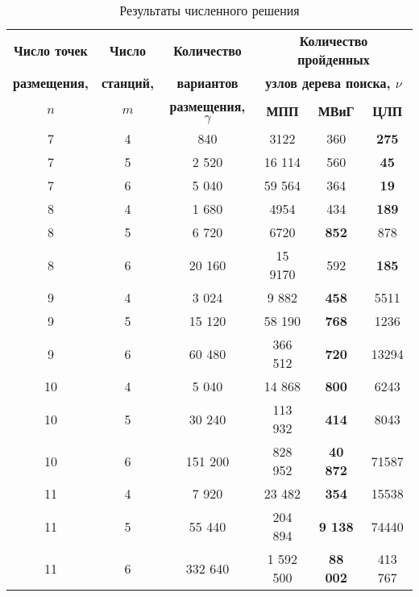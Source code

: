 \begin{frame}
    \small
    \begin{table}
        \caption{Результаты численного решения}\label{tab:models_comparation}
        \begin{tabular}{|ccc|*{3}{c}|} \cline{3-6}
        \hline
        \textbf{Число точек} & \textbf{Число} &\textbf{Количество} & \multicolumn{3}{c|}{\textbf{Количество пройденных}}\\ 
        \textbf{размещения,} & \textbf{станций,} & \textbf{вариантов} & \multicolumn{3}{c|}{\textbf{узлов дерева поиска, $\nu$}}\\
        \cline{4-6}
        \textbf{$n$} & \textbf{$m$} &\textbf{размещения, $\gamma$} & \textbf{МПП}& \textbf{МВиГ} & \textbf{ЦЛП} \\ 
        \hline
        7 &  4 & 840 & 3122 & 360 &  \textbf{275} \\
        7 &  5 & 2 520 & 16 114 & 560  &  \textbf{45}  \\
        7 &  6 & 5 040 & 59 564 & 364  &  \textbf{19}  \\
        8 &  4 & 1 680 &  4954 &  434 &   \textbf{189} \\
        8 &  5 & 6 720 & 6720 & \textbf{852}  &  878 \\
        8 &  6 & 20 160 &  15 9170 & 592  & \textbf{185}  \\
        9  &  4 & 3 024 & 9 882 & \textbf{458} & 5511 \\
        9  &  5 & 15 120&  58 190 &  \textbf{768} &  1236\\
        9  &  6 & 60 480&  366 512 &  \textbf{720} & 13294 \\
        10 &  4 & 5 040&  14 868&  \textbf{800}&  6243\\
        10 &	5 & 30 240&  113 932&  \textbf{414}&  8043\\
        10 &	6 & 151 200&  828 952&  \textbf{40 872}&  71587\\
        11 &  4 & 7 920& 23 482&  \textbf{354} & 15538\\
        11 &	5 & 55 440& 204 894& \textbf{9 138}&  74440\\
        11 &	6 & 332 640& 1 592 500 & \textbf{88 002} & 413 767 \\
        \hline
        \end{tabular}
      \end{table} 
\end{frame}

